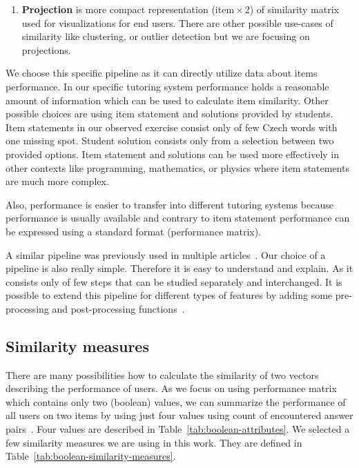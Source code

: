 \documentclass[
  print, %
  table,   %
  nolof,     %
  nolot,     %
  nocover,
  color,
  final,
]{fithesis3}
\begin{document}
\begin{enumerate}
  \item
    \textbf{Projection} is more compact representation (item\,$\times$\,2) of similarity matrix used for visualizations for end users. There are other possible use-cases of similarity like clustering, or outlier detection but we are focusing on projections.
\end{enumerate}


We choose this specific pipeline as it can directly utilize data about items performance. In our specific tutoring system performance holds a reasonable amount of information which can be used to calculate item similarity. Other possible choices are using item statement and solutions provided by students. Item statements in our observed exercise consist only of few Czech words with one missing spot. Student solution consists only from a selection between two provided options. Item statement and solutions can be used more effectively in other contexts like programming, mathematics, or physics where item statements are much more complex.

Also, performance is easier to transfer into different tutoring systems because performance is usually available and contrary to item statement performance can be expressed using a standard format (performance matrix).

A similar pipeline was previously used in multiple articles~\cite{pelanek2018programming, kaser2013cluster}. Our choice of a pipeline is also really simple. Therefore it is easy to understand and explain. As it consists only of few steps that can be studied separately and interchanged. It is possible to extend this pipeline for different types of features by adding some pre-processing and post-processing functions~\cite{kaser2013cluster}.


\subsection{Similarity measures}\label{similarity-measures}

There are many possibilities how to calculate the similarity of two vectors describing the performance of users. As we focus on using performance matrix which contains only two (boolean) values, we can summarize the performance of all users on two items by using just four values using count of encountered answer pairs~\cite{choi2010survey}. Four values are described in Table~\ref{tab:boolean-attributes}. We selected a few similarity measures we are using in this work. They are defined in Table~\ref{tab:boolean-similarity-measures}.
\end{document}
